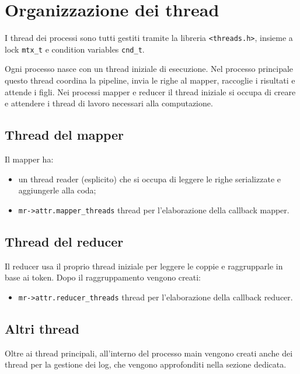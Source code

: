 \documentclass[11pt,a4paper]{article}
\begin{document}
\newpage
\section{Organizzazione dei thread}

I thread dei processi sono tutti gestiti tramite la libreria \texttt{<threads.h>}, insieme a lock \texttt{mtx\_t} e condition variables \texttt{cnd\_t}.

Ogni processo nasce con un thread iniziale di esecuzione. Nel processo principale questo thread coordina la pipeline, invia le righe al mapper, raccoglie i risultati e attende i figli. Nei processi mapper e reducer il thread iniziale si occupa di creare e attendere i thread di lavoro necessari alla computazione.

\subsection{Thread del mapper}

Il mapper ha:

\begin{itemize}
    \item un thread reader (esplicito) che si occupa di leggere le righe serializzate e aggiungerle alla coda;
    \item \texttt{mr->attr.mapper\_threads} thread per l'elaborazione della callback mapper.
\end{itemize}

\subsection{Thread del reducer}

Il reducer usa il proprio thread iniziale per leggere le coppie e raggrupparle in base ai token. Dopo il raggruppamento vengono creati:

\begin{itemize}
    \item \texttt{mr->attr.reducer\_threads} thread per l'elaborazione della callback reducer.
\end{itemize}

\subsection{Altri thread}

Oltre ai thread principali, all'interno del processo main vengono creati anche dei thread per la gestione dei log, che vengono approfonditi nella sezione dedicata.
\end{document}
